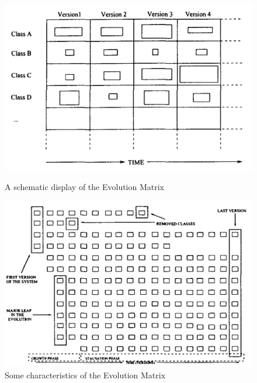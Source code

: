 \begin{figure}[ht]
\centering
  \includegraphics[width=\linewidth]{EvolutionMatrix1.png}
  \caption{A schematic display of the Evolution Matrix}
  \label{fig:EvolutionMatrix1}
\endminipage\hfill
{}
\centering
  \includegraphics[width=\linewidth]{EvolutionMatrix2.png}
  \caption{Some characteristics of the Evolution Matrix}
  \label{fig:EvolutionMatrix2}
\endminipage\hfill
\end{figure}

